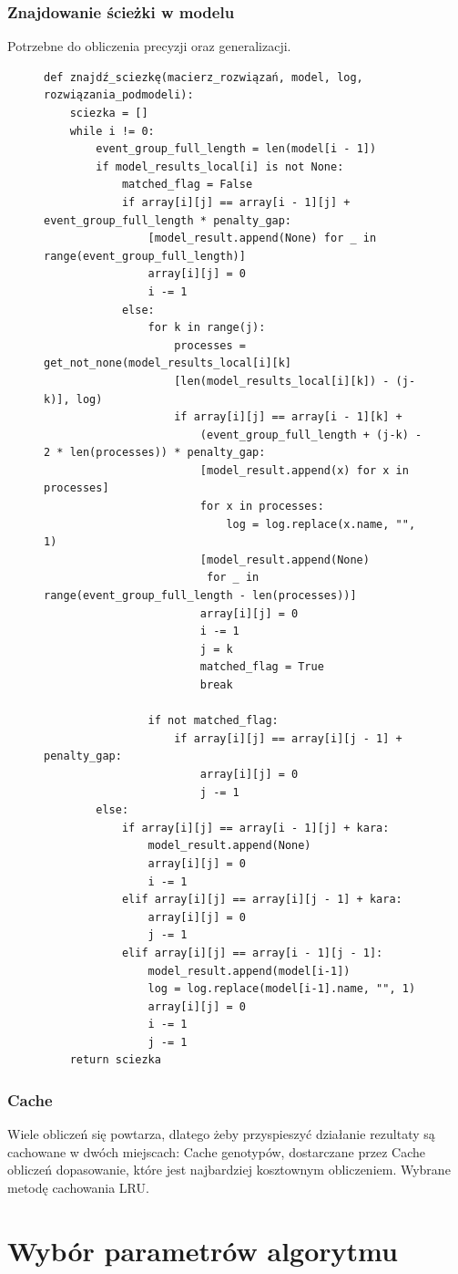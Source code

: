 \subsubsection{Znajdowanie ścieżki w modelu}
Potrzebne do obliczenia precyzji oraz generalizacji.
\begin{figure}[!ht]
\lstset{caption=Znajdowanie ścieżki w modelu, captionpos=b}
\lstset{label=src:traceback, frame=single}
\begin{lstlisting}
def znajdź_sciezkę(macierz_rozwiązań, model, log, rozwiązania_podmodeli):
    sciezka = []
    while i != 0:
        event_group_full_length = len(model[i - 1])
        if model_results_local[i] is not None:
            matched_flag = False
            if array[i][j] == array[i - 1][j] + event_group_full_length * penalty_gap:
                [model_result.append(None) for _ in range(event_group_full_length)]
                array[i][j] = 0
                i -= 1
            else:
                for k in range(j):
                    processes = get_not_none(model_results_local[i][k]
                    [len(model_results_local[i][k]) - (j-k)], log)
                    if array[i][j] == array[i - 1][k] + 
                    	(event_group_full_length + (j-k) - 2 * len(processes)) * penalty_gap:
                        [model_result.append(x) for x in processes]
                        for x in processes:
                            log = log.replace(x.name, "", 1)
                        [model_result.append(None) 
                         for _ in range(event_group_full_length - len(processes))]
                        array[i][j] = 0
                        i -= 1
                        j = k
                        matched_flag = True
                        break

                if not matched_flag:
                    if array[i][j] == array[i][j - 1] + penalty_gap:
                        array[i][j] = 0
                        j -= 1
        else:
            if array[i][j] == array[i - 1][j] + kara:
                model_result.append(None)
                array[i][j] = 0
                i -= 1
            elif array[i][j] == array[i][j - 1] + kara:
                array[i][j] = 0
                j -= 1
            elif array[i][j] == array[i - 1][j - 1]:
                model_result.append(model[i-1])
                log = log.replace(model[i-1].name, "", 1)
                array[i][j] = 0
                i -= 1
                j -= 1
    return sciezka
\end{lstlisting}
\end{figure}
\clearpage
\subsubsection{Cache}

Wiele obliczeń się powtarza, dlatego żeby przyspieszyć działanie rezultaty są cachowane w dwóch miejscach:
Cache genotypów, dostarczane przez 
Cache obliczeń dopasowanie, które jest najbardziej kosztownym obliczeniem. Wybrane metodę cachowania LRU.  
\section{Wybór parametrów algorytmu}
